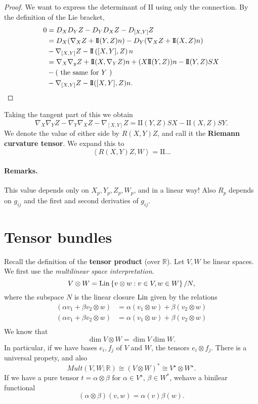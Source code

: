 \begin{proof}
    We want to express the determinant of \( \mathrm{I\!I} \) using only the connection. By the definition of the Lie bracket,
    \begin{align*}
        0 &= D_X D_Y Z - D_Y D_X Z - D_{[X, Y]}Z \\
          &= D_X ( \nabla_X Z + \mathrm{I\!I}(Y, Z)n ) - D_Y (\nabla_X Z + \mathrm{I\!I}(X, Z)n) \\ &- \nabla_{[X,Y]}Z - \mathrm{I\!I} \left( [X, Y], Z \right)n \\
          &= \nabla_X \nabla_y Z + \mathrm{I\!I}(X, \nabla_Y Z)n + (X \mathrm{I\!I}(Y, Z))n - \mathrm{I\!I}(Y, Z)SX \\
          &- (\text{ the same for \( Y \) }) \\
          &- \nabla_{[X, Y]} Z - \mathrm{I\!I}( [X, Y], Z )n.
    \end{align*}
\end{proof}
Taking the tangent part of this we obtain
\[ 
    \nabla_X \nabla_Y Z - \nabla_Y \nabla_X Z - \nabla_{[X, Y]} Z = \mathrm{I\!I}(Y,Z)SX - \mathrm{I\!I}(X,Z)SY.
\]
We denote the value of either side by \( R(X,Y)Z \), and call it the \textbf{Riemann curvature tensor}. We expand this to
\[ 
    \left\langle R(X,Y)Z, W \right\rangle = \mathrm{I\!I} ...
\]
\paragraph{Remarks.} This value depends only on \( X_p, Y_p, Z_p, W_p \), and in a linear way! Also \( R_p \) depends on \( g_{ij} \) and the first and second derivaties of \( g_{ij} \).

\section{Tensor bundles}

Recall the definition of the \textbf{tensor product} (over \( \mathbb{R} \)). Let \( V, W \) be linear spaces. We first use the \emph{multilinear space interpretation}.
\[ 
    V \otimes W = \operatorname{Lin} \left\{ v \otimes w : v \in V, w \in W \right\}/N,
\]
where the subspace \( N \) is the linear closure \( \operatorname{Lin} \) given by the relations
\begin{align*}
    (\alpha v_1 + \beta v_2 \otimes w) &= \alpha (v_1 \otimes w) + \beta (v_2 \otimes w) \\ 
    (\alpha v_1 + \beta v_2 \otimes w) &= \alpha (v_1 \otimes w) + \beta (v_2 \otimes w) \\ 
\end{align*}
We know that
\[ 
    \dim V \otimes W = \dim V \dim W.
\]
In particular, if we have bases \( e_i, f_j \) of \( V \) and \( W \), the tensors \( e_i \otimes f_j \). There is a universal propety, and also 
\[ 
    Mult(V,W; \mathbb{R} ) \cong (V \otimes W)^* \cong V^\star \otimes W^\star.
\]
If we have a pure tensor \( t = \alpha \otimes \beta \) for \( \alpha \in V^\star \), \( \beta \in W^* \), wehave a binilear functional
\[ 
    (\alpha \otimes \beta) (v, w) = \alpha(v) \beta(w). 
\]

